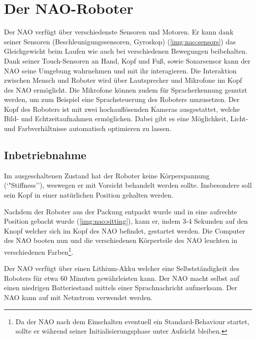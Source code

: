 \chapter{Der NAO-Roboter}

    Der NAO verfügt über verschiedenste Sensoren und Motoren.
    Er kann dank seiner Sensoren (Beschleunigungssensoren, Gyroskop)
    (\autoref{img:nao:sensors}) das Gleichgewicht
    beim Laufen wie auch bei verschiedenen Bewegungen beibehalten.
    Dank seiner Touch-Sensoren an Hand, Kopf und Fuß, sowie Sonarsensor kann der
    NAO seine Umgebung wahrnehmen und mit ihr interagieren.
    Die Interaktion zwischen Mensch und Roboter wird über Lautsprecher und
    Mikrofone im Kopf des NAO ermöglicht.
    Die Mikrofone können zudem für Spracherkennung genutzt werden, um zum
    Beispiel eine Sprachsteuerung des Roboters umzusetzen.
    Der Kopf des Roboters ist mit zwei hochauflösenden Kameras ausgestattet,
    welche Bild- und Echtzeitaufnahmen ermöglichen.
    Dabei gibt es eine Möglichkeit, Licht- und Farbverhältnisse automatisch
    optimieren zu lassen.

    \section{Inbetriebnahme}

        Im ausgeschaltenen Zustand hat der Roboter keine Körperspannung
        (`"Stiffness''), weswegen er mit Vorsicht behandelt werden sollte.
        Insbesondere soll sein Kopf in einer natürlichen Position gehalten
        werden.

        Nachdem der Roboter aus der Packung entpackt wurde und in eine aufrechte
        Position gebacht wurde (\autoref{img:nao:sitting}), kann er, indem 3-4
        Sekunden auf den Knopf welcher sich im Kopf des NAO befindet, gestartet
        werden.
        Die Computer des NAO booten nun und die verschiedenen Körperteile des
        NAO leuchten in verschiedenen Farben\footnote{
            Da der NAO nach dem Einschalten eventuell ein Standard-Behaviour
            startet, sollte er während seiner Initialisierungsphase unter
            Aufsicht bleiben.
        }.

        Der NAO verfügt über einen Lithium-Akku welcher eine Selbstständigkeit
        des Roboters für etwa 60 Minuten gewährleisten kann.
        Der NAO macht selbst auf einen niedrigen Batteriestand mittels einer
        Sprachnachricht aufmerksam. Der NAO kann auf mit Netzstrom verwendet
        werden.

